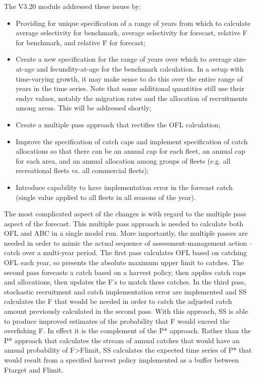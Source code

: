 The V3.20 module addressed these issues by:
\begin{itemize}
	\item Providing for unique specification of a range of years from which to calculate average selectivity for benchmark, average selectivity for forecast, relative F for benchmark, and relative F for forecast;
	\item Create a new specification for the range of years over which to average size-at-age and fecundity-at-age for the benchmark calculation.  In a setup with time-varying growth, it may make sense to do this over the entire range of years in the time series.  Note that some additional quantities still use their endyr values, notably the migration rates and the allocation of recruitments among areas.  This will be addressed shortly;
	\item Create a multiple pass approach that rectifies the OFL calculation;
	\item Improve the specification of catch caps and implement specification of catch allocations so that there can be an annual cap for each fleet, an annual cap for each area, and an annual allocation among groups of fleets (e.g. all recreational fleets vs. all commercial fleets);
	\item Introduce capability to have implementation error in the forecast catch (single value applied to all fleets in all seasons of the year).
\end{itemize}

The most complicated aspect of the changes is with regard to the multiple pass aspect of the forecast.  This multiple pass approach is needed to calculate both OFL and ABC in a single model run.  More importantly, the multiple passes are needed in order to mimic the actual sequence of assessment-management action – catch over a multi-year period.  The first pass calculates OFL based on catching OFL each year, so presents the absolute maximum upper limit to catches.  The second pass forecasts a catch based on a harvest policy, then applies catch caps and allocations, then updates the F’s to match these catches.  In the third pass, stochastic recruitment and catch implementation error are implemented and SS calculates the F that would be needed in order to catch the adjusted catch amount previously calculated in the second pass.  With this approach, SS is able to produce improved estimates of the probability that F would exceed the overfishing F.  In effect it is the complement of the P* approach.  Rather than the P* approach that calculates the stream of annual catches that would have an annual probability of F>Flimit, SS calculates the expected time series of P* that would result from a specified harvest policy implemented as a buffer between Ftarget and Flimit.

